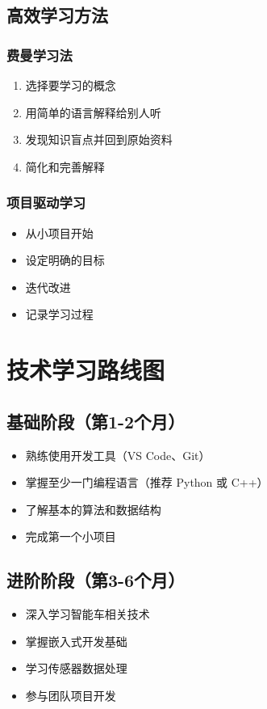 \documentclass[a4paper,12pt]{article}
\begin{document}
\subsection{高效学习方法}

\subsubsection{费曼学习法}
\begin{enumerate}
    \item 选择要学习的概念
    \item 用简单的语言解释给别人听
    \item 发现知识盲点并回到原始资料
    \item 简化和完善解释
\end{enumerate}

\subsubsection{项目驱动学习}
\begin{itemize}
    \item 从小项目开始
    \item 设定明确的目标
    \item 迭代改进
    \item 记录学习过程
\end{itemize}

\section{技术学习路线图}

\subsection{基础阶段（第1-2个月）}
\begin{itemize}
    \item 熟练使用开发工具（VS Code、Git）
    \item 掌握至少一门编程语言（推荐 Python 或 C++）
    \item 了解基本的算法和数据结构
    \item 完成第一个小项目
\end{itemize}

\subsection{进阶阶段（第3-6个月）}
\begin{itemize}
    \item 深入学习智能车相关技术
    \item 掌握嵌入式开发基础
    \item 学习传感器数据处理
    \item 参与团队项目开发
\end{itemize}
\end{document}
